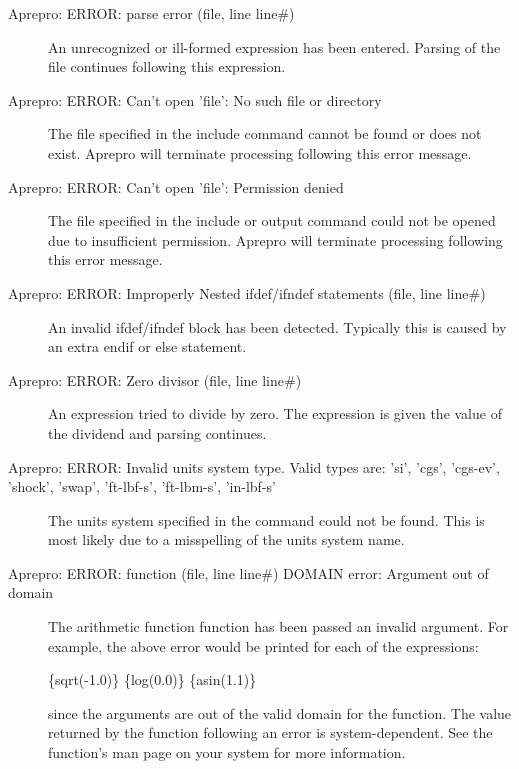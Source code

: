 \begin{description}
\item[Aprepro:  ERROR:  parse  error  (file,  line  line\#)]    
An unrecognized or ill-formed expression has been entered. Parsing of
the file continues following this expression.

\item[Aprepro: ERROR: Can't open 'file': No such file or directory] The file specified 
in the include command cannot be found or does not exist. Aprepro will terminate 
processing following this error message.

\item[Aprepro: ERROR: Can't open 'file': Permission denied] The file specified in the 
include or output command could not be opened due to insufficient permission. 
Aprepro will terminate processing following this error message.

\item[Aprepro: ERROR: Improperly Nested ifdef/ifndef statements (file, line line\#)] 
An invalid ifdef/ifndef block has been detected. Typically this is caused by an 
extra endif or else statement.

\item[Aprepro:  ERROR:    Zero  divisor  (file,  line  line\#)]    An expression tried
to divide by zero. The expression is given the value of the dividend and parsing continues.

\item[Aprepro: ERROR: Invalid units system type. Valid types are: 'si', 'cgs', 'cgs-ev', 'shock', 'swap', 'ft-lbf-s', 'ft-lbm-s', 'in-lbf-s'] 
The units system specified in the command could not be found. This
is most likely due to a misspelling of the units system name.

\item[Aprepro: ERROR: function (file, line line\#) DOMAIN error: Argument out of domain]
The arithmetic function function has been passed an invalid
argument. For example, the above error would be printed for each of
the expressions:
\begin{apinp}
\{sqrt(-1.0)\}  \{log(0.0)\}  \{asin(1.1)\}
\end{apinp}

since the arguments are out of the valid domain for the function. The
value returned by the function following an error is
system-dependent. See the function's man page on your system for more
information.


\end{description}

